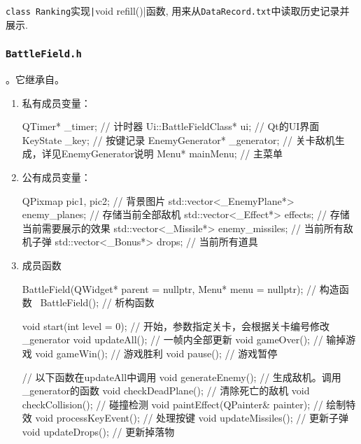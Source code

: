 \documentclass[UTF8,12pt]{ctexart}
\begin{document}
	            \texttt{class Ranking}实现\texttt|void refill()|函数, 用来从\texttt{DataRecord.txt}中读取历史记录并展示.

	        \subsubsection{\tt BattleField.h}
	            。它继承自。
	            \begin{enumerate}[nosep,label={\arabic*. }]
	                \item 私有成员变量：
	                    \begin{cppcode}
                            QTimer* _timer; // 计时器
                            Ui::BattleFieldClass* ui; // Qt的UI界面
                            KeyState _key; // 按键记录
                            EnemyGenerator* _generator; // 关卡敌机生成，详见EnemyGenerator说明
                            Menu* mainMenu; // 主菜单
                        \end{cppcode}
	                \item 公有成员变量：
	                    \begin{cppcode}
                            QPixmap pic1, pic2; // 背景图片
                            std::vector<_EnemyPlane*> enemy_planes; // 存储当前全部敌机
                            std::vector<_Effect*> effects; // 存储当前需要展示的效果
                            std::vector<_Missile*> enemy_missiles; // 当前所有敌机子弹
                            std::vector<_Bonus*> drops; // 当前所有道具
                        \end{cppcode}
	                \item 成员函数
	                    \begin{cppcode}
                            BattleField(QWidget* parent = nullptr, Menu* menu = nullptr); // 构造函数
                            ~BattleField(); // 析构函数

                            void start(int level = 0); // 开始，参数指定关卡，会根据关卡编号修改_generator
                            void updateAll(); // 一帧内全部更新
                            void gameOver(); // 输掉游戏
                            void gameWin(); // 游戏胜利
                            void pause(); // 游戏暂停

                            // 以下函数在updateAll中调用
                            void generateEnemy(); // 生成敌机。调用_generator的函数
                            void checkDeadPlane(); // 清除死亡的敌机
                            void checkCollision(); // 碰撞检测
                            void paintEffect(QPainter& painter); // 绘制特效
                            void processKeyEvent(); // 处理按键
                            void updateMissiles(); // 更新子弹
                            void updateDrops(); // 更新掉落物
                            

\end{cppcode}
\end{enumerate}
\end{document}
